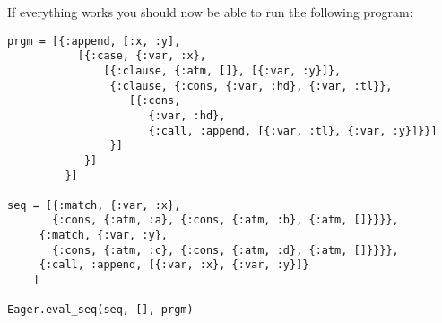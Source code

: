 \documentclass[a4paper,11pt]{article}
\begin{document}
If everything works you should now be able to run the following program:

\begin{verbatim}
prgm = [{:append, [:x, :y],
           [{:case, {:var, :x}, 
               [{:clause, {:atm, []}, [{:var, :y}]},
                {:clause, {:cons, {:var, :hd}, {:var, :tl}}, 
                   [{:cons, 
                      {:var, :hd}, 
                      {:call, :append, [{:var, :tl}, {:var, :y}]}}]
                }]
            }]
         }]
         
seq = [{:match, {:var, :x}, 
       {:cons, {:atm, :a}, {:cons, {:atm, :b}, {:atm, []}}}},
     {:match, {:var, :y}, 
       {:cons, {:atm, :c}, {:cons, {:atm, :d}, {:atm, []}}}},
     {:call, :append, [{:var, :x}, {:var, :y}]}
    ]
    
Eager.eval_seq(seq, [], prgm)
\end{verbatim}
\end{document}
